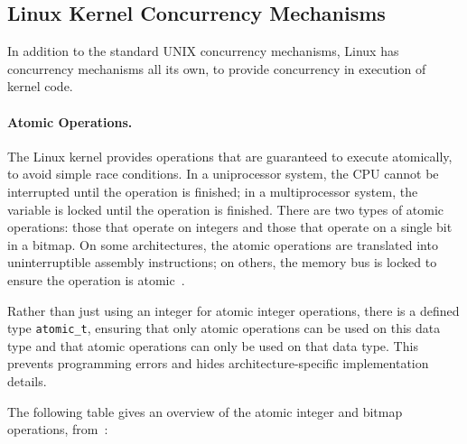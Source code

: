 \subsection*{Linux Kernel Concurrency Mechanisms}

In addition to the standard UNIX concurrency mechanisms, Linux has concurrency mechanisms all its own, to provide concurrency in execution of kernel code. 

\paragraph{Atomic Operations.} The Linux kernel provides operations that are guaranteed to execute atomically, to avoid simple race conditions. In a uniprocessor system, the CPU cannot be interrupted until the operation is finished; in a multiprocessor system, the variable is locked until the operation is finished. There are two types of atomic operations: those that operate on integers and those that operate on a single bit in a bitmap. On some architectures, the atomic operations are translated into uninterruptible assembly instructions; on others, the memory bus is locked to ensure the operation is atomic~\cite{osi}.

Rather than just using an integer for atomic integer operations, there is a defined type \texttt{atomic\_t}, ensuring that only atomic operations can be used on this data type and that atomic operations can only be used on that data type. This prevents programming errors and hides architecture-specific implementation details.

The following table gives an overview of the atomic integer and bitmap operations, from~\cite{lkd}:


